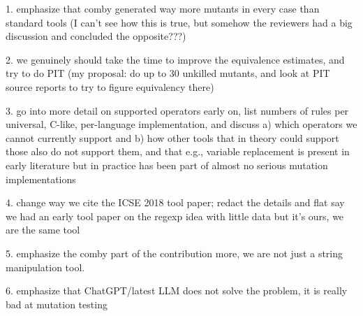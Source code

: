 1. emphasize that comby generated way more mutants in every case than standard tools (I can't see how this is true, but somehow the reviewers had a big discussion and concluded the opposite???)

2.  we genuinely should take the time to improve the equivalence estimates, and try to do PIT (my proposal:  do up to 30 unkilled mutants, and look at PIT source reports to try to figure equivalency there)

3.  go into more detail on supported operators early on, list numbers of rules per universal, C-like, per-language implementation, and discuss a) which operators we cannot currently support and b) how other tools that in theory could support those also do not support them, and that e.g., variable replacement is present in early literature but in practice has been part of almost no serious mutation implementations

4. change way we cite the ICSE 2018 tool paper; redact the details and flat say we had an early tool paper on the regexp idea with little data but it's ours, we are the same tool

5. emphasize the comby part of the contribution more, we are not just a string manipulation tool.

6. emphasize that ChatGPT/latest LLM does not solve the problem, it is really bad at mutation testing
